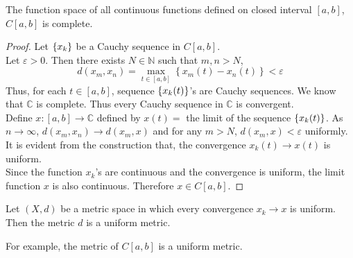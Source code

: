 \begin{theorem}
	The function space of all continuous functions defined on closed interval $[a,b]$, $C[a,b]$ is complete.
\end{theorem}
\begin{proof}
	Let $\left\{x_k\right\}$ be a Cauchy sequence in $C[a,b]$.\\
	Let $\varepsilon > 0$.
	Then there exists $N \in \mathbb{N}$ such that $m,n > N$, 
	\[ d(x_m,x_n) = \max_{t \in [a,b]} \left\{ x_m(t) - x_n(t) \right\} < \varepsilon \]
	Thus, for each $t \in [a,b]$, sequence $\left\{x_k(t)\right\}$'s are Cauchy sequences.
	We know that $\mathbb{C}$ is complete.
	Thus every Cauchy sequence in $\mathbb{C}$ is convergent.\\

	Define $x : [a,b] \to \mathbb{C}$ defined by $x(t) = $ the limit of the sequence $\left\{x_k(t)\right\}$.
	As $n \to \infty$, $d(x_m,x_n) \to d(x_m,x)$ and for any $m > N$, $d(x_m,x) < \varepsilon$ uniformly.
	It is evident from the construction that, the convergence $x_k(t) \to x(t)$ is uniform.\\

	Since the function $x_k$'s are continuous and the convergence is uniform, the limit function $x$ is also continuous.
	Therefore $x \in C[a,b]$.
\end{proof}

\begin{definition}
	Let $(X,d)$ be a metric space in which every convergence $x_k \to x$ is uniform.
	Then the metric $d$ is a uniform metric.
\end{definition}
For example, the metric of $C[a,b]$ is a uniform metric.

